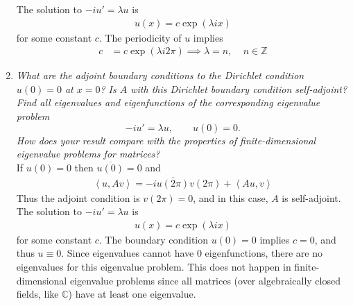 \documentclass{article} %
\theoremstyle{plain}
\def\Cx{\mathbb{C}}
\newcommand{\VEC}[2]{\left\langle #1, #2 \right\rangle}
\begin{document}
\begin{enumerate}[\bf (a)]
        The solution to $-i u' = \lambda u$ is
        \begin{align*}
            u(x) = c\exp(\lambda i x)
        \end{align*}
        for some constant $c$.  The periodicity of $u$ implies
        \begin{align*}
            c &= c\exp(\lambda i 2\pi) \implies \lambda = n,\ \ \ \ \ n \in \mathbb{Z}
        \end{align*}
    \item
        \emph{What are the adjoint boundary conditions to the Dirichlet condition $u(0) = 0$ at $x = 0$?  Is $A$ with this Dirichlet boundary condition self-adjoint?  Find all eigenvalues and eigenfunctions of the corresponding eigenvalue problem $$ -iu' = \lambda u, \qquad u(0) = 0.$$  How does your result compare with the properties of finite-dimensional eigenvalue problems for matrices?} \\

        If $u(0) = 0$ then $\overline{u(0)} = 0$ and 
        \begin{align*}
            \VEC{u}{Av} = -i\overline{u(2\pi)}v(2\pi) + \VEC{Au}{v}
        \end{align*}
        Thus the adjoint condition is $v(2\pi) = 0$, and in this case, $A$ is self-adjoint.  The solution to $-iu' = \lambda u$ is
        \begin{align*}
            u(x) = c\exp(\lambda i x)
        \end{align*}
        for some constant $c$.  The boundary condition $u(0) = 0$ implies $c = 0$, and thus $u \equiv 0$.  Since eigenvalues cannot have $0$ eigenfunctions, there are no eigenvalues for this eigenvalue problem.  This does not happen in finite-dimensional eigenvalue problems since all matrices (over algebraically closed fields, like $\Cx$) have at least one eigenvalue.
\end{enumerate}
\end{document}
